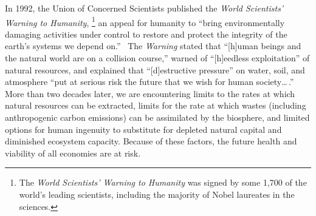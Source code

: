 


In 1992, the Union of Concerned Scientists 
published the
\emph{World Scientists' Warning to Humanity},%
	\footnote{ %
	The \emph{World Scientists' Warning to Humanity} 
	was signed by some 1,700 of the world's leading scientists, 
	including the majority of Nobel laureates in the sciences. 
	} 
an appeal for humanity to 
``bring environmentally damaging activities under control 
to restore and protect the integrity of the earth's systems 
we depend on.''~\cite{UCS1992}
The \emph{Warning} stated that 
``[h]uman beings and the natural world are on a collision course,''  %
warned of ``[h]eedless exploitation'' of natural resources, 
and explained that ``[d]estructive pressure'' on water, soil, and atmosphere
``put at serious risk the future that we wish 
for human society\dots{}\,.''
More than two decades later, we are encountering 
limits to the rates at which natural resources can be extracted, 
limits for the rate at which wastes (including anthropogenic carbon emissions) 
can be assimilated by the biosphere, and
limited options for human ingenuity to substitute 
for depleted natural capital and diminished ecosystem capacity. 
Because of these factors, 
the future health and viability of all economies are at risk.\cite{IPCC2013} 

